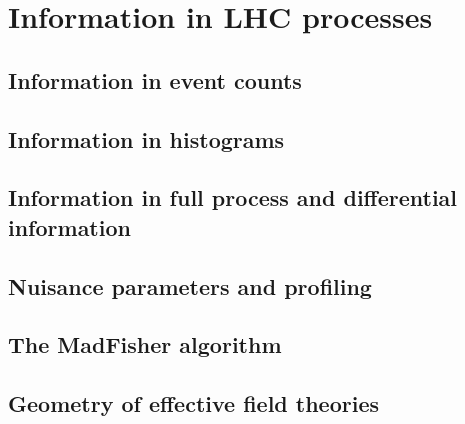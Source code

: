 \section{Information in LHC processes}
\label{sec:information_madfisher}

\subsection{Information in event counts}

\subsection{Information in histograms}

\subsection{Information in full process and differential information}

\subsection{Nuisance parameters and profiling}

\subsection{The MadFisher algorithm}

\subsection{Geometry of effective field theories}



